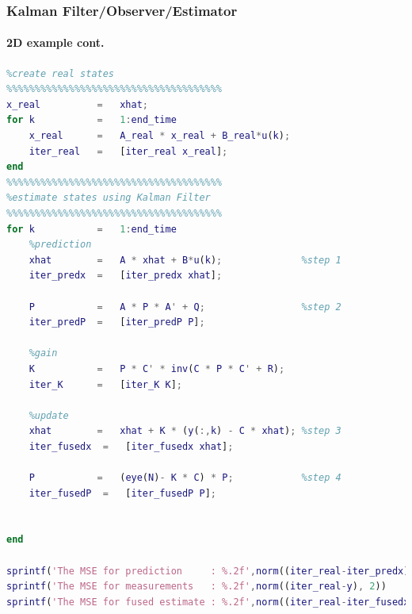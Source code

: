 \begin{frame}[fragile]
\frametitle{Kalman Filter/Observer/Estimator}
\framesubtitle{2D example \tiny cont.}

\tinyvvv \begin{lstlisting}[language=Matlab]
%%%%%%%%%%%%%%%%%%%%%%%%%%%%%%%%%%%%%%
%create real states
%%%%%%%%%%%%%%%%%%%%%%%%%%%%%%%%%%%%%%
x_real          =   xhat;
for k           =   1:end_time
    x_real      =   A_real * x_real + B_real*u(k);
    iter_real   =   [iter_real x_real]; 
end
%%%%%%%%%%%%%%%%%%%%%%%%%%%%%%%%%%%%%%
%estimate states using Kalman Filter
%%%%%%%%%%%%%%%%%%%%%%%%%%%%%%%%%%%%%%
for k           =   1:end_time
    %prediction
    xhat        =   A * xhat + B*u(k);              %step 1
    iter_predx  =   [iter_predx xhat];      
    
    P           =   A * P * A' + Q;                 %step 2
    iter_predP  =   [iter_predP P];      
    
    %gain
    K           =   P * C' * inv(C * P * C' + R);   
    iter_K      =   [iter_K K];         
    
    %update
    xhat        =   xhat + K * (y(:,k) - C * xhat); %step 3          
    iter_fusedx  =   [iter_fusedx xhat];
    
    P           =   (eye(N)- K * C) * P;            %step 4
    iter_fusedP  =   [iter_fusedP P];      

    
end

sprintf('The MSE for prediction     : %.2f',norm((iter_real-iter_predx), 2))
sprintf('The MSE for measurements   : %.2f',norm((iter_real-y), 2))
sprintf('The MSE for fused estimate : %.2f',norm((iter_real-iter_fusedx), 2))
\end{lstlisting}
\end{frame}




